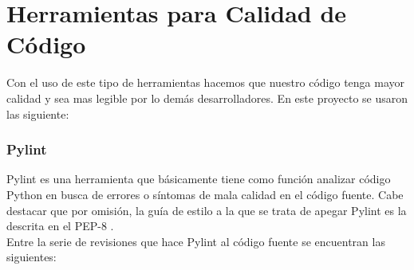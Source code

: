 \section{Herramientas para Calidad de Código}
\label{2:sec4}

Con el uso de este tipo de herramientas hacemos que nuestro código tenga mayor calidad y sea mas legible por lo demás desarrolladores. En este proyecto se usaron las siguiente:\\
\subsubsection{Pylint}
Pylint es una herramienta que básicamente tiene como función analizar código Python en busca de errores o síntomas de mala calidad en el código fuente.
Cabe destacar que por omisión, la guía de estilo a la que se trata de apegar Pylint es la descrita en el PEP-8 \cite{URL:PEP8}.\\ 

Entre la serie de revisiones que hace Pylint al código fuente se encuentran las siguientes:\\

